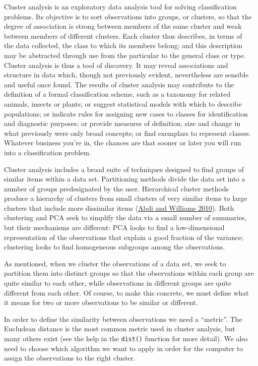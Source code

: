 \documentclass[
]{svmono}
\begin{document}
Cluster analysis is an exploratory data analysis tool for solving
classification problems. Its objective is to sort observations into
groups, or clusters, so that the degree of association is strong between
members of the same cluster and weak between members of different
clusters. Each cluster thus describes, in terms of the data collected,
the class to which its members belong; and this description may be
abstracted through use from the particular to the general class or type.
Cluster analysis is thus a tool of discovery. It may reveal associations
and structure in data which, though not previously evident, nevertheless
are sensible and useful once found. The results of cluster analysis may
contribute to the definition of a formal classification scheme, such as
a taxonomy for related animals, insects or plants; or suggest
statistical models with which to describe populations; or indicate rules
for assigning new cases to classes for identification and diagnostic
purposes; or provide measures of definition, size and change in what
previously were only broad concepts; or find exemplars to represent
classes. Whatever business you're in, the chances are that sooner or
later you will run into a classification problem.

Cluster analysis includes a broad suite of techniques designed to find
groups of similar items within a data set. Partitioning methods divide
the data set into a number of groups predesignated by the user.
Hierarchical cluster methods produce a hierarchy of clusters from small
clusters of very similar items to large clusters that include more
dissimilar items (\protect\hyperlink{ref-abdi2010}{Abdi and Williams 2010}). Both clustering and PCA seek to simplify
the data via a small number of summaries, but their mechanisms are
different: PCA looks to find a low-dimensional representation of the
observations that explain a good fraction of the variance; clustering
looks to find homogeneous subgroups among the observations.

As mentioned, when we cluster the observations of a data set, we seek to
partition them into distinct groups so that the observations within each
group are quite similar to each other, while observations in different
groups are quite different from each other. Of course, to make this
concrete, we must define what it means for two or more observations to
be similar or different.

In order to define the similarity between observations we need a
``metric''. The Eucludean distance is the most common metric used in
cluster analysis, but many others exist (see the help in the \texttt{dist()}
function for more detail). We also need to choose which algorithm we
want to apply in order for the computer to assign the observations to
the right cluster.
\end{document}
